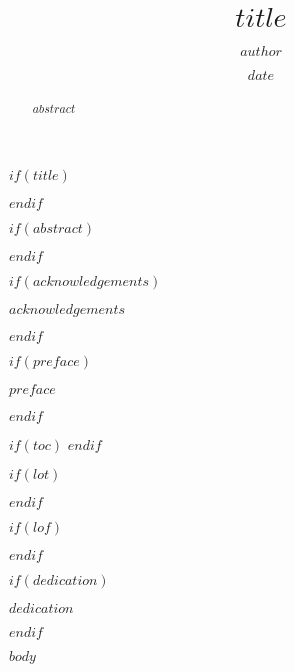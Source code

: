 \documentclass[letterpaper, 12pt, oneside]{gcthesis}
\title{$title$}
\author{$author$}
\date{$date$}
\begin{document}

$if(title)$
  \maketitle
$endif$

\frontmatter
$if(abstract)$
\begin{abstract}
	$abstract$
\end{abstract}
$endif$

$if(acknowledgements)$
  \begin{acknowledgements}
    $acknowledgements$
  \end{acknowledgements}
$endif$

$if(preface)$
  \begin{preface}
    $preface$
  \end{preface}
$endif$

$if(toc)$
  \hypersetup{linkcolor=$if(toccolor)$$toccolor$$else$black$endif$}
  \setcounter{tocdepth}{$toc-depth$}
  \tableofcontents
$endif$

$if(lot)$
  \listoftables
$endif$

$if(lof)$
  \listoffigures
$endif$

$if(dedication)$
  \begin{dedication}
    $dedication$
  \end{dedication}
$endif$

\mainmatter
\pagestyle{fancyplain}
\fancyfoot[CO,CE]{\thepage}
$body$


\end{document}
